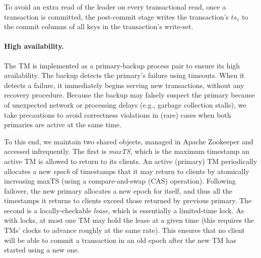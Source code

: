 To avoid an extra read of the leader on every transactional read, once a transaction is committed, the post-commit stage writes 
the transaction's $ts_c$ to the commit columns of all keys in  the transaction's write-set. 

\paragraph{High availability.} The TM is implemented as a primary-backup process pair to ensure its high availability. 
The backup detects the primary's failure using timeouts. When it detects a failure, it immediately begins serving new
transactions, without any recovery procedure. Because the backup may falsely suspect the primary because of
unexpected network or processing delays (e.g., garbage collection stalls), we take precautions to avoid correctness
violations in (rare) cases when both primaries are active at the same time.

To this end, we maintain two shared objects, managed in Apache Zookeeper and accessed infrequently.
The first is \emph{maxTS}, which is the maximum timestamp an active TM is allowed to return to its clients.
An active (primary) TM periodically allocates a new \emph{epoch} of timestamps that it may return to clients by atomically
increasing maxTS (using a compare-and-swap (CAS) operation).  
Following failover, the new primary  allocates a new epoch for itself, and thus all the timestamps it returns to clients
exceed those returned by previous primary. 
The second is a locally-checkable \emph{lease}, which is essentially a  limited-time lock. 
As with locks, at most one TM may hold the lease at a given time (this requires the TMs' clocks to advance roughly at the same rate). 
This ensures that no client will be able to commit a transaction in an old epoch after the new TM has started 
using a new one.




